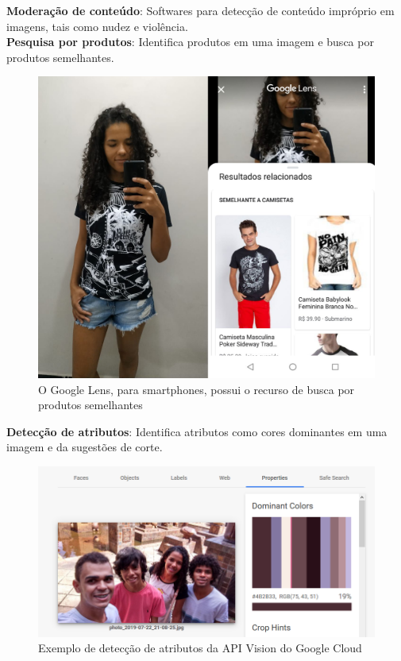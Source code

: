 \documentclass{article}
\begin{document}
\textbf{Moderação de conteúdo}: Softwares para detecção de conteúdo impróprio em imagens, tais como nudez e violência. \\
\textbf{Pesquisa por produtos}: Identifica produtos em uma imagem e busca por produtos semelhantes. \\
\begin{figure}[H]
    \centering
    \includegraphics[scale=0.3]{imagens/produtos_semelhantes.png}
    \caption{O Google Lens, para smartphones, possui o recurso de busca por produtos semelhantes}
    \label{fig:produtos_semelhantes}
\end{figure}{}
\textbf{Detecção de atributos}: Identifica atributos como cores dominantes em uma imagem e da sugestões de corte.\\
\begin{figure}[H]
    \centering
    \includegraphics[scale=0.3]{imagens/propriedades.png}
    \caption{Exemplo de detecção de atributos da API Vision do Google Cloud}
    \label{fig:atributos}
\end{figure}{}
\end{document}

